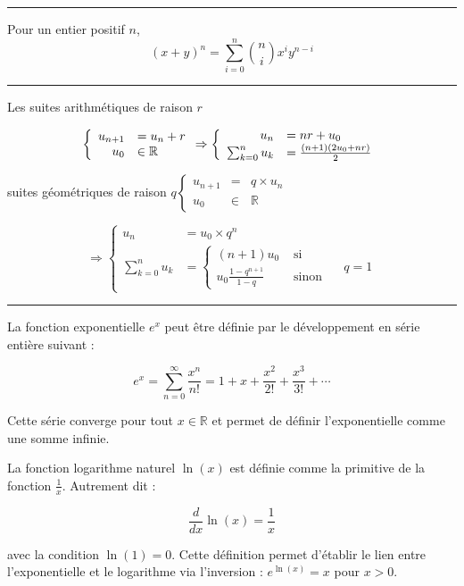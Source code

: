 \hrule
\begin{f}
	
	Pour un entier positif \(n\),
	\[
	(x+y)^n=\sum_{i=0}^n\binom{n}{i} x^i y^{n-i}
	\]
	
\end{f}
\hrule
\begin{f}[Suites]  
	
	Les suites arithmétiques de raison \(r\)
	
	\[
	\left\{\begin{array} { r l } 
		{ u _ { n + 1 } } & { = u _ { n } + r } \\
		{ u _ { 0 } } & { \in \mathbb { R } }
	\end{array} \Rightarrow \left\{\begin{array}{rl}
		u_n & =n r+u_0 \\
		\sum_{k=0}^n u_k & =\frac{(n+1)\left(2 u_0+n r\right)}{2}
	\end{array}\right.\right.
	\]
	
	suites géométriques de raison \(q\left\{\begin{array}{rll}u_{n+1} & = & q \times u_n \\ u_0 & \in & \mathbb{R}\end{array}\right.\)
	
	\[
	\Rightarrow\left\{\begin{array}{rlr}
		u_n & =u_0 \times q^n \\
		\sum_{k=0}^n u_k & =\left\{\begin{array}{rl}
			(n+1) u_0 & \text { si } \\
			u_0 \frac{1-q^{n+1}}{1-q} & \text { sinon }
		\end{array} \quad q=1\right.
	\end{array}\right.
	\]
	
\end{f}
\hrule
\begin{f}
	La fonction exponentielle \( e^x \) peut être définie par le développement en série entière suivant :
	
	\[
	e^x = \sum_{n=0}^{\infty} \frac{x^n}{n!} = 1 + x + \frac{x^2}{2!} + \frac{x^3}{3!} + \cdots
	\]
	
	Cette série converge pour tout \( x \in \mathbb{R} \) et permet de définir l'exponentielle comme une somme infinie.
	
	
	La fonction logarithme naturel \( \ln(x) \) est définie comme la primitive de la fonction \( \frac{1}{x} \). Autrement dit :
	
	\[
	\frac{d}{dx} \ln(x) = \frac{1}{x}
	\]
	
	avec la condition \( \ln(1) = 0 \). Cette définition permet d'établir le lien entre l'exponentielle et le logarithme via l'inversion : \( e^{\ln(x)} = x \) pour \( x > 0 \).
	
\end{f}



